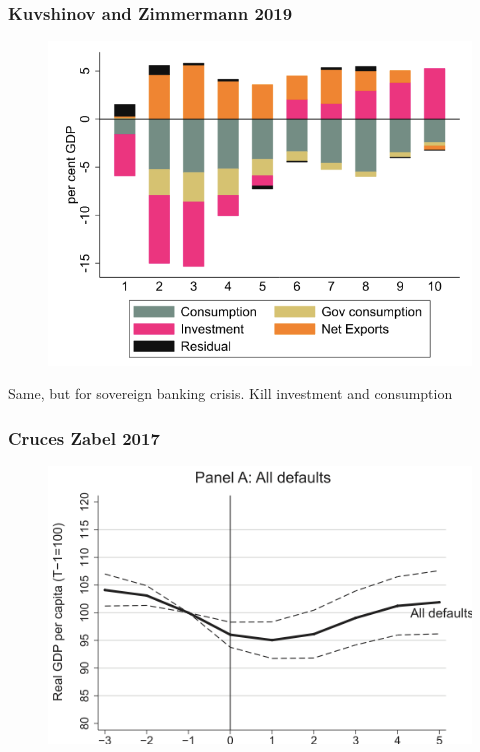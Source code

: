 \documentclass{beamer}
\begin{document}
\begin{frame}
\frametitle{Kuvshinov and  Zimmermann 2019}
\begin{figure}
\centering
\includegraphics[scale=0.7]{Kuvshinov_6.png}
\end{figure}
Same, but for sovereign banking crisis.  Kill investment and consumption
\end{frame}

\begin{frame}
\frametitle{Cruces Zabel 2017 }
\begin{figure}
\centering
\includegraphics[scale=1]{Cruces1.png}
\end{figure}
\end{frame}
\end{document}

